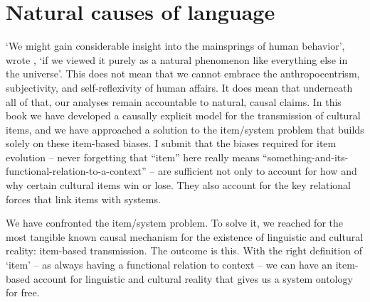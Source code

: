 \section{Natural causes of language}


\textquoteleft We might gain considerable insight into the mainsprings of human 
behavior', wrote \citet[v]{zipf_human_1949}, \textquoteleft if we viewed it purely as a natural 
phenomenon like everything else in the universe'. This does not mean 
that we cannot embrace the anthropocentrism, subjectivity, and 
self-reflexivity of human affairs. It does mean that underneath all of 
that, our analyses remain accountable to natural, causal claims. In this book we have developed a causally explicit model for the 
transmission of cultural items, and we have approached a solution to the 
item/system problem that builds solely on these item-based biases. I 
submit that the biases required for item evolution -- never forgetting that 
``item'' here really means 
``something-and-its-functional-relation-to-a-context'' -- are sufficient not 
only to account for how and why certain cultural items win or lose. They 
also account for the key relational forces that link items 
with systems. 


We have confronted the item/system problem. To solve it, we 
reached for the most tangible known causal mechanism for the existence 
of linguistic and cultural reality: item-based transmission. The outcome is this. With the right definition of `item' -- as always having a functional relation to context -- we can have 
an item-based account for linguistic and cultural reality that gives us 
a system ontology for free.




